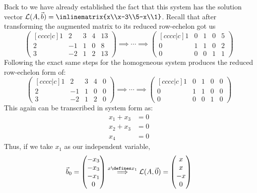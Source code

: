 \begin{exm}\label{exm-homogeneous-solution}
	Back to  we have already established
	the fact that this system has the solution vector
	$\mathcal{L}(A,\vec{b})=\inlinematrix{x\\x-3\\5-x\\1}$.
	Recall that after transforming the augmented matrix to its reduced row-echelon
	got us
	\begin{equation*}
		\begin{pmatrix}[cccc|c]
			1 & 2  & 3 & 4 & 13 \\
			2 & -1 & 1 & 0 & 8  \\
			3 & -2 & 1 & 2 & 13
		\end{pmatrix}
		\implies\cdots\implies
		\begin{pmatrix}[cccc|c]
			1 & 0 & 1 & 0 & 5 \\
			0 & 1 & 1 & 0 & 2 \\
			0 & 0 & 0 & 1 & 1
		\end{pmatrix}
	\end{equation*}
	Following the exact same steps for the homogeneous system produces the
	reduced row-echelon form of:
	\begin{equation*}
		\begin{pmatrix}[cccc|c]
			1 & 2  & 3 & 4 & 0 \\
			2 & -1 & 1 & 0 & 0 \\
			3 & -2 & 1 & 2 & 0
		\end{pmatrix}
		\implies\cdots\implies
		\begin{pmatrix}[cccc|c]
			1 & 0 & 1 & 0 & 0 \\
			0 & 1 & 1 & 0 & 0 \\
			0 & 0 & 0 & 1 & 0
		\end{pmatrix}
	\end{equation*}
	This again can be transcribed in system form as:
	\begin{align*}
		x_1 + x_3 & = 0 \\
		x_2 + x_3 & = 0 \\
		x_4       & = 0
	\end{align*}
	Thus, if we take $x_1$ as our independent variable,
	\begin{equation*}
		\vec{b}_0=
		\begin{pmatrix}
			-x_3 \\
			-x_3 \\
			-x_1 \\
			0
		\end{pmatrix}\overset{x\defines x_1}{\Longrightarrow}\mathcal{L}(A,\vec{0})=
		\begin{pmatrix}
			x  \\
			x  \\
			-x \\
			0
		\end{pmatrix}
	\end{equation*}
\end{exm}

